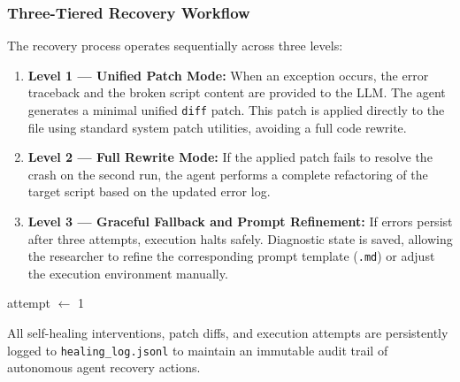 \documentclass[conference]{IEEEtran}
\begin{document}
\subsubsection{Three-Tiered Recovery Workflow}
The recovery process operates sequentially across three levels:

\begin{enumerate}
    \item \textbf{Level 1 — Unified Patch Mode:} When an exception occurs, the error traceback and the broken script content are provided to the LLM. The agent generates a minimal unified \texttt{diff} patch. This patch is applied directly to the file using standard system patch utilities, avoiding a full code rewrite.

    \item \textbf{Level 2 — Full Rewrite Mode:} If the applied patch fails to resolve the crash on the second run, the agent performs a complete refactoring of the target script based on the updated error log.

    \item \textbf{Level 3 — Graceful Fallback and Prompt Refinement:} If errors persist after three attempts, execution halts safely. Diagnostic state is saved, allowing the researcher to refine the corresponding prompt template (\texttt{.md}) or adjust the execution environment manually.
\end{enumerate}

\begin{algorithm}[t]
\SetAlgoLined
{}
attempt $\leftarrow$ 1\;
\caption{Multi-Tiered Self-Healing Script Execution Loop}
\label{alg:self_healing}
\end{algorithm}

All self-healing interventions, patch diffs, and execution attempts are persistently logged to \texttt{healing\_log.jsonl} to maintain an immutable audit trail of autonomous agent recovery actions.
\end{document}
